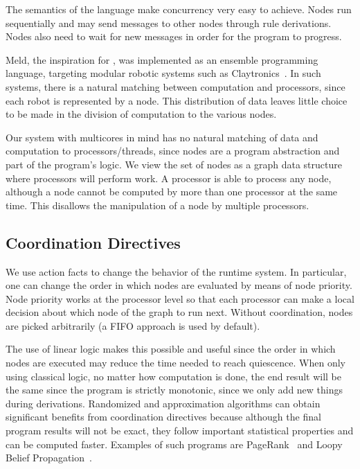 The semantics of the \lang language make concurrency very easy to achieve.
Nodes run sequentially and may send messages to other nodes through rule derivations. Nodes
also need to wait for new messages in order for the program to progress.

Meld, the inspiration for \lang, was
implemented as an ensemble programming language, targeting modular robotic systems such as
Claytronics~\cite{ashley-rollman-derosa-iros07wksp}. In such systems, there is a natural matching
between computation and processors, since each robot is represented by a node. This distribution
of data leaves little choice to be made in the division of computation to the various nodes.

Our \lang system with multicores in mind has no natural matching of data and computation to processors/threads,
since nodes are a program abstraction and part of the program's logic.
We view the set of nodes as a graph data structure where processors will perform work.
A processor is able to process any node, although a node cannot be computed by more than one processor
at the same time. This disallows the manipulation of a node by multiple processors.

\subsection{Coordination Directives}

We use action facts to change the behavior of the runtime system. In particular, one can change the
order in which nodes are evaluated by means of node priority. Node priority works at the processor level
so that each processor can make a local decision about which node of the graph to run next. Without coordination,
nodes are picked arbitrarily (a FIFO approach is used by default).

The use of linear logic makes this possible and useful since the order in which nodes are executed
may reduce the time needed to reach quiescence. When only using
classical logic, no matter how computation is done, the end result will be the same since the program
is strictly monotonic, since we only add new things during derivations. Randomized and approximation
algorithms can obtain significant benefits from coordination directives because although the final program results
will not be exact, they follow important statistical properties and can be computed faster.
Examples of such programs are PageRank~\cite{Lubachevsky:1986:CAA:4904.4801} and
Loopy Belief Propagation~\cite{Gonzalez+al:aistats09paraml}.


